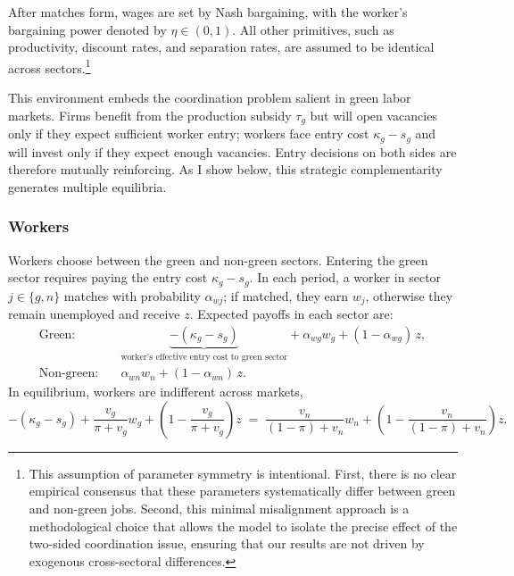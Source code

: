 \documentclass[preprint,12pt]{elsarticle}
\begin{document}
After matches form, wages are set by Nash bargaining, with the worker's bargaining power denoted by $\eta \in (0,1)$. All other primitives, such as productivity, discount rates, and separation rates, are assumed to be identical across sectors.\footnote{This assumption of parameter symmetry is intentional. First, there is no clear empirical consensus that these parameters systematically differ between green and non-green jobs. Second, this minimal misalignment approach is a methodological choice that allows the model to isolate the precise effect of the two-sided coordination issue, ensuring that our results are not driven by exogenous cross-sectoral differences.}

This environment embeds the coordination problem salient in green labor markets. Firms benefit from the production subsidy $\tau_g$ but will open vacancies only if they expect sufficient worker entry; workers face entry cost $\kappa_g-s_g$ and will invest only if they expect enough vacancies. Entry decisions on both sides are therefore mutually reinforcing. As I show below, this strategic complementarity generates multiple equilibria.

\subsubsection{Workers}

Workers choose between the green and non-green sectors. Entering the green sector requires paying the entry cost $\kappa_g - s_g$. In each period, a worker in sector $j\in\{g,n\}$ matches with probability $\alpha_{wj}$; if matched, they earn $w_j$, otherwise they remain unemployed and receive $z$. Expected payoffs in each sector are:
\begin{align*}
  \text{Green:}\quad & \underbrace{-(\kappa_g-s_g)}_{\text{worker's effective entry cost to green sector}} + \alpha_{wg} w_g + (1-\alpha_{wg})\, z,\\
  \text{Non-green:}\quad & \alpha_{wn} w_n + (1-\alpha_{wn})\, z.
\end{align*}
In equilibrium, workers are indifferent across markets,
{\small
\begin{equation}
  -(\kappa_g-s_g) + \frac{v_g}{\pi+v_g} w_g + \left(1-\frac{v_g}{\pi+v_g}\right) z
  \;=\;
  \frac{v_n}{(1-\pi)+v_n} w_n + \left(1-\frac{v_n}{(1-\pi)+v_n}\right) z.
\end{equation}
}
\end{document}
